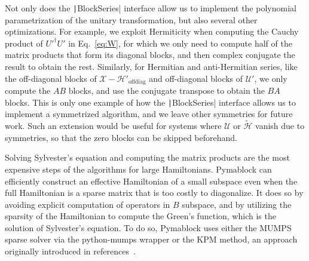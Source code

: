 Not only does the \texttt|BlockSeries| interface allow us to
implement the polynomial parametrization of the unitary transformation, but
also several other optimizations.
For example, we exploit Hermiticity when computing the Cauchy product of
$U'^{\dagger}U'$ in Eq.~\eqref{eq:W}, for which we only need to compute half of
the matrix products that form its diagonal blocks, and then complex conjugate
the result to obtain the rest.
Similarly, for Hermitian and anti-Hermitian series, like the off-diagonal
blocks of $\mathcal{X} - \mathcal{H}'_\textrm{offdiag}$ and off-diagonal blocks
of $\mathcal{U}'$, we only compute the $AB$ blocks, and use the conjugate
transpose to obtain the $BA$ blocks.
This is only one example of how the \texttt|BlockSeries| interface
allows us to implement a symmetrized algorithm, and we leave other symmetries
for future work.
Such an extension would be useful for systems where $\mathcal{U}$ or
$\tilde{\mathcal{H}}$ vanish due to symmetries, so that the zero blocks can be
skipped beforehand.

Solving Sylvester's equation and computing the matrix products are the most
expensive steps of the algorithms for large Hamiltonians.
Pymablock can efficiently construct an effective Hamiltonian of a small
subspace even when the full Hamiltonian is a sparse matrix that is too costly to
diagonalize.
It does so by avoiding explicit computation of operators in $B$ subspace, and
by utilizing the sparsity of the Hamiltonian to compute the Green's function,
which is the solution of Sylvester's equation.
To do so, Pymablock uses either the MUMPS sparse solver via the python-mumps
wrapper or the KPM method, an approach originally introduced in
references~\cite{Weisse_2006, Irfan_2019}.


